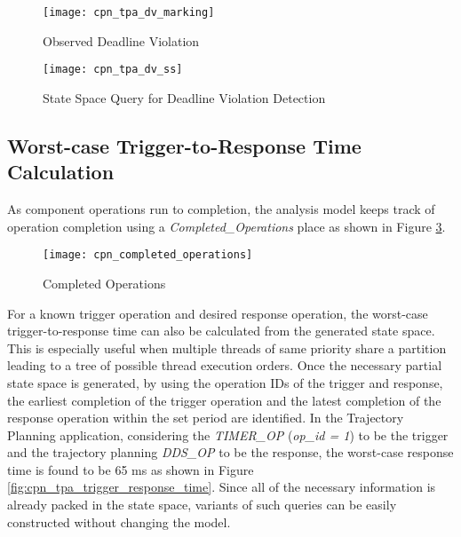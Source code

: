 \begin{figure}[ht]
\centering
\texttt{[image: cpn\_tpa\_dv\_marking]}
\caption{Observed Deadline Violation}
\label{fig:cpn_tpa_dv_marking}
\vspace{-0.2in}
\end{figure}
\vspace{0.1in}

\begin{figure}[ht]
\centering
\texttt{[image: cpn\_tpa\_dv\_ss]}
\caption{State Space Query for Deadline Violation Detection}
\label{fig:cpn_tpa_dv_ss}
\vspace{-0.2in}
\end{figure}

\subsection{Worst-case Trigger-to-Response Time Calculation}

As component operations run to completion, the analysis model keeps track of operation completion using a \emph{Completed\_Operations} place as shown in Figure \ref{fig:cpn_completed_operations}. 

\begin{figure}[ht]
\centering
\texttt{[image: cpn\_completed\_operations]}
\caption{Completed Operations}
\label{fig:cpn_completed_operations}
\vspace{-0.2in}
\end{figure}
\vspace{0.1in}

For a known trigger operation and desired response operation, the worst-case trigger-to-response time can also be calculated from the generated state space. This is especially useful when multiple threads of same priority share a partition leading to a tree of possible thread execution orders. Once the necessary partial state space is generated, by using the operation IDs of the trigger and response, the earliest completion of the trigger operation and the latest completion of the response operation within the set period are identified. In the Trajectory Planning application, considering the \emph{TIMER\_OP} (\emph{op\_id = 1}) to be the trigger and the trajectory planning \emph{DDS\_OP} to be the response, the worst-case response time is found to be 65 ms as shown in Figure \ref{fig:cpn_tpa_trigger_response_time}. Since all of the necessary information is already packed in the state space, variants of such queries can be easily constructed without changing the model.

